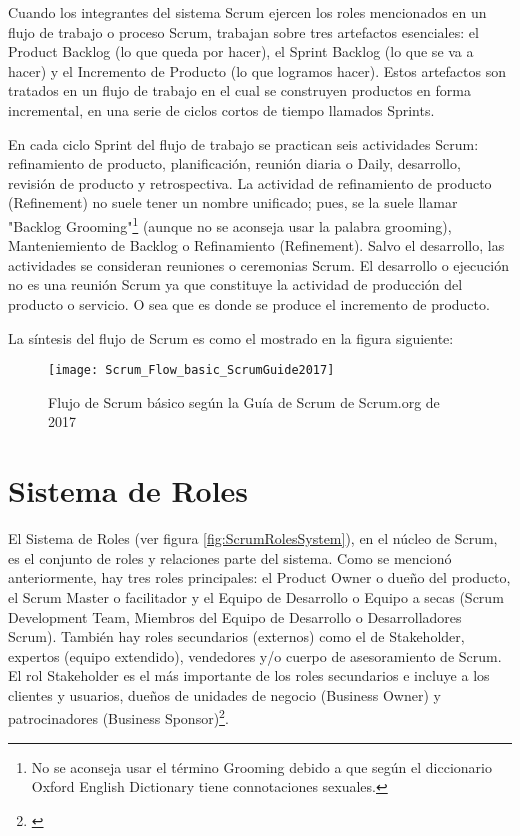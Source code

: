 Cuando los integrantes del sistema Scrum ejercen los roles mencionados en un flujo de trabajo o proceso Scrum, trabajan sobre tres artefactos esenciales: el Product Backlog (lo que queda por hacer), el Sprint Backlog (lo que se va a hacer) y el Incremento de Producto (lo que logramos hacer). Estos artefactos son tratados en un flujo de trabajo en el cual se construyen productos en forma incremental, en una serie de ciclos cortos de tiempo llamados Sprints. 

En cada ciclo Sprint del flujo de trabajo se practican seis actividades Scrum: refinamiento de producto, planificación, reunión diaria o Daily, desarrollo, revisión de producto y retrospectiva. La actividad de refinamiento de producto (Refinement) no suele tener un nombre unificado; pues, se la suele llamar "Backlog Grooming"\footnote{No se aconseja usar el término Grooming debido a que según el diccionario Oxford English Dictionary tiene connotaciones sexuales.} (aunque no se aconseja usar la palabra grooming), Manteniemiento de Backlog o Refinamiento (Refinement). Salvo el desarrollo, las actividades se consideran reuniones o ceremonias Scrum. El desarrollo o ejecución no es una reunión Scrum ya que constituye la actividad de producción del producto o servicio. O sea que es donde se produce el incremento de producto.

La síntesis del flujo de Scrum es como el mostrado en la figura siguiente:

\begin{figure}[h]
  \centering
  \texttt{[image: Scrum\_Flow\_basic\_ScrumGuide2017]}
  \caption{Flujo de Scrum básico según la Guía de Scrum de Scrum.org de 2017}
  \centering
  \label{fig:Scrum_Flow_basic_ScrumGuide2017} %
\end{figure}

\section{Sistema de Roles}

El Sistema de Roles (ver figura \ref{fig:ScrumRolesSystem}), en el núcleo de Scrum, es el conjunto de roles y relaciones parte del sistema. Como se mencionó anteriormente, hay tres roles principales: el Product Owner o dueño del producto, el Scrum Master o facilitador y el Equipo de Desarrollo o Equipo a secas (Scrum Development Team, Miembros del Equipo de Desarrollo o Desarrolladores Scrum). También hay roles secundarios (externos) como el de Stakeholder, expertos (equipo extendido), vendedores y/o cuerpo de asesoramiento de Scrum. El rol Stakeholder es el más importante de los roles secundarios e incluye a los clientes y usuarios, dueños de unidades de negocio (Business Owner) y patrocinadores (Business Sponsor)\footnote{\cite{SBOK-2013}}.

